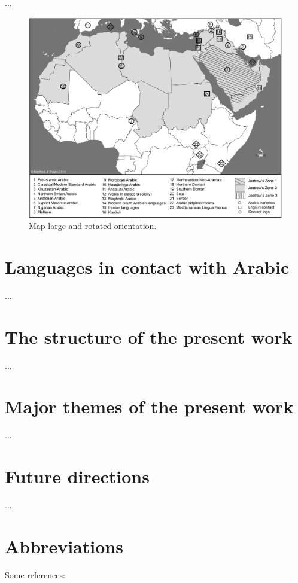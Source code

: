 \documentclass[output=paper]{langsci/langscibook}
\begin{document}
...
  
\begin{figure}
\includegraphics[height=.66\textheight, angle=90]{figures/Monde_arabe.jpg}
\caption{Map large and rotated orientation.}
\label{intromaplarge}
\end{figure}


\section{Languages in contact with Arabic}\label{introcontactlans}
...

\section{The structure of the present work}\label{introstructure}
...

\section{Major themes of the present work}\label{introthemes}
...

\section{Future directions}\label{introfuture}
...

\section*{Abbreviations}

Some references:\\
\\
\citet{Jastrow2002}\\
\citet{Owens2000editor}\\
\citet{Watson2011dialectsoverview}



\sloppy
\printbibliography[heading=subbibliography,notkeyword=this] 
\end{document}
